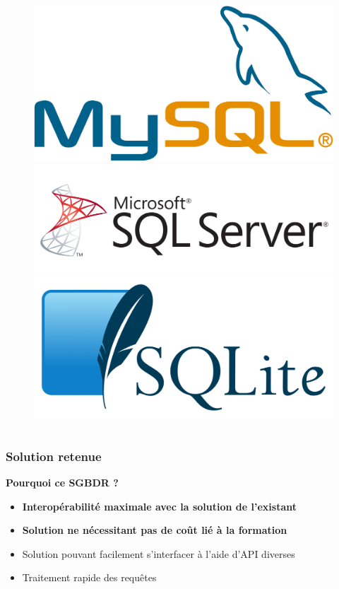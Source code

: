 \begin{frame}
\begin{columns}
\begin{column}{7cm}
\begin{figure}
\includegraphics[scale=0.04]{Images/MySQL}\\
\includegraphics[scale=0.052]{Images/MsSqlServer}
\includegraphics[scale=0.052]{Images/SQLite}
\end{figure}
\end{column}
\end{columns}
\end{frame}

\begin{frame}
\frametitle{Solution retenue}
\begin{block}{\textbf{Pourquoi ce SGBDR ?}}
\begin{itemize}
 \item<2-> \textbf{Interopérabilité maximale avec la solution de l'existant}
 \item<3-> \textbf{Solution ne nécessitant pas de coût lié à la formation}
 \item<4-> Solution pouvant facilement s'interfacer à l'aide d'API diverses
 \item<5-> Traitement rapide des requêtes
\end{itemize}
\end{block}
\end{frame}

